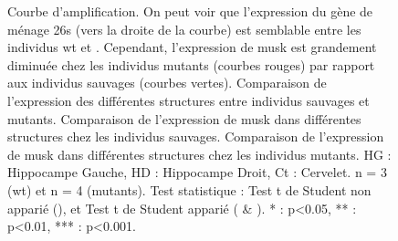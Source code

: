 \begin{figure}[h]
{				 Courbe d'amplification. On peut voir que l'expression du gène de ménage \acrshort{26s} (vers la droite de la courbe) est semblable entre les individus \gls{wt} et \mcrd. Cependant, l'expression de \gls{musk} est grandement diminuée chez les individus mutants (courbes rouges) par rapport aux individus sauvages (courbes vertes).
				 Comparaison de l'expression des différentes structures entre individus sauvages et mutants.
				 Comparaison de l'expression de \gls{musk} dans différentes structures chez les individus sauvages.
				 Comparaison de l'expression de \gls{musk} dans différentes structures chez les individus mutants.
				HG : Hippocampe Gauche, HD : Hippocampe Droit, Ct : Cervelet. n = 3 (\gls{wt}) et n = 4 (mutants). Test statistique : Test t de Student non apparié (), et Test t de Student apparié ( \& ). 
				* : p<0.05, ** : p<0.01, *** : p<0.001. 
				}
		\label{fig:ExpressionMuSK}
	\end{figure}
\FloatBarrier
